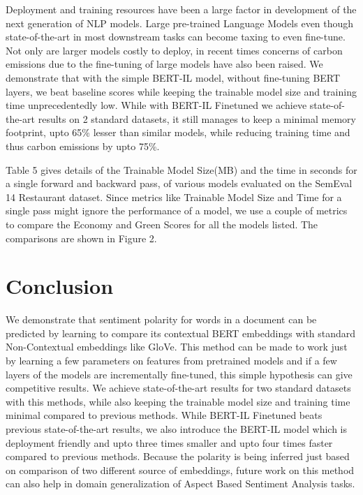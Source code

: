 \documentclass[11pt,a4paper]{article}
\begin{document}
Deployment and training resources have been a large factor in development of the next generation of NLP models. Large pre-trained Language Models even though state-of-the-art in most downstream tasks can become taxing to even fine-tune. Not only are larger models costly to deploy, in recent times concerns of carbon emissions due to the fine-tuning of large models have also been raised. We demonstrate that with the simple BERT-IL model, without fine-tuning BERT layers, we beat baseline scores while keeping the trainable model size and training time unprecedentedly low. While with BERT-IL Finetuned we achieve state-of-the-art results on 2 standard datasets, it still manages to keep a minimal memory footprint, upto 65\% lesser than similar models, while reducing training time and thus carbon emissions by upto 75\%. 

Table 5 gives details of the Trainable Model Size(MB) and the time in seconds for a single forward and backward pass, of various models evaluated on the SemEval 14 Restaurant dataset. Since metrics like Trainable Model Size and Time for a single pass might ignore the performance of a model, we use a couple of metrics to compare the Economy and Green Scores for all the models listed. The comparisons are shown in Figure 2. 

\section{Conclusion}

We demonstrate that sentiment polarity for words in a document can be predicted by learning to compare its contextual BERT embeddings with standard Non-Contextual embeddings like GloVe. This method can be made to work just by learning a few parameters on features from pretrained models and if a few layers of the models are incrementally fine-tuned, this simple hypothesis can give competitive results. We achieve state-of-the-art results for two standard datasets with this methods, while also keeping the trainable model size and training time minimal compared to previous methods. While BERT-IL Finetuned beats previous state-of-the-art results, we also introduce the BERT-IL model which is deployment friendly and upto three times smaller and upto four times faster compared to previous methods. Because the polarity is being inferred just based on comparison of two different source of embeddings, future work on this method can also help in domain generalization of Aspect Based Sentiment Analysis tasks.







\end{document}
